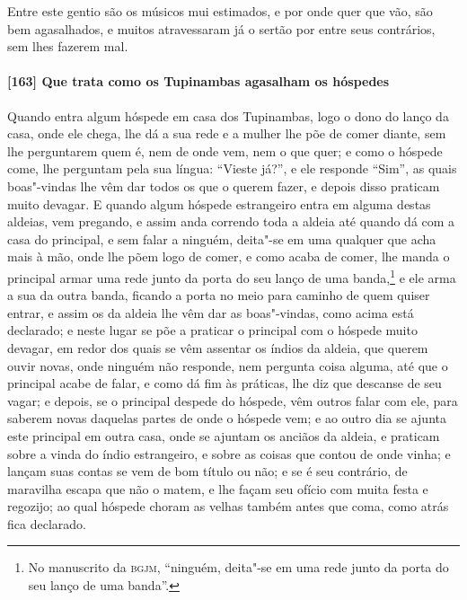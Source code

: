 \begin{linenumbers}
Entre este gentio são os músicos mui estimados, e por onde quer que vão, são bem
agasalhados, e muitos atravessaram já o sertão por entre seus contrários, sem lhes fazerem
mal.

\paragraph{[163] Que trata como os Tupinambas agasalham os hóspedes}\quad
Quando entra algum hóspede em casa dos Tupinambas, logo o dono do lanço da casa, onde ele
chega, lhe dá a sua rede e a mulher lhe põe de comer diante, sem lhe perguntarem quem é,
nem de onde vem, nem o que quer; e como o hóspede come, lhe perguntam pela sua língua:
``Vieste já?'', e ele responde ``Sim'', as quais boas"-vindas lhe vêm dar todos os que o
querem fazer, e depois disso praticam muito devagar. E quando algum hóspede estrangeiro
entra em alguma destas aldeias, vem pregando, e assim anda correndo toda a aldeia até
quando dá com a casa do principal, e sem falar a ninguém, deita"-se em uma qualquer que
acha mais à mão, onde lhe põem logo de comer, e como acaba de comer, lhe manda o principal
armar uma rede junto da porta do seu lanço de uma banda,\footnote{ No manuscrito da
\textsc{bgjm}, ``ninguém, deita"-se em uma rede junto da porta do seu lanço de uma
banda''.} e ele arma a sua da outra banda, ficando a porta no meio para caminho de quem
quiser entrar, e assim os da aldeia lhe vêm dar as boas"-vindas, como acima está declarado;
e neste lugar se põe a praticar o principal com o hóspede muito devagar, em redor dos
quais se vêm assentar os índios da aldeia, que querem ouvir novas, onde ninguém não
responde, nem pergunta coisa alguma, até que o principal acabe de falar, e como dá fim às
práticas, lhe diz que descanse de seu vagar; e depois, se o principal despede do hóspede,
vêm outros falar com ele, para saberem novas daquelas partes de onde o hóspede vem; e ao
outro dia se ajunta este principal em outra casa, onde se ajuntam os anciãos da aldeia, e
praticam sobre a vinda do índio estrangeiro, e sobre as coisas que contou de onde vinha; e
lançam suas contas se vem de bom título ou não; e se é seu contrário, de maravilha escapa
que não o matem, e lhe façam seu ofício com muita festa e regozijo; ao qual hóspede choram
as velhas também antes que coma, como atrás fica declarado.


\end{linenumbers}
